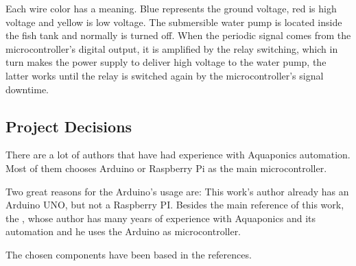 Each wire color has a meaning.
Blue represents the ground voltage,
red is high voltage
and yellow is low voltage.
The submersible water pump is located inside the fish tank and normally is turned off.
When the periodic signal comes from the microcontroller's digital output,
it is amplified by the relay switching,
which in turn makes the power supply to deliver high voltage to the water pump,
the latter works until the relay is switched again by the microcontroller's signal downtime.

\subsection{Project Decisions}
There are a lot of authors that have had experience with Aquaponics automation.
Most of them chooses Arduino or Raspberry Pi as the main microcontroller.

Two great reasons for the Arduino's usage are:
This work's author already has an Arduino UNO,
but not a Raspberry PI.
Besides the main reference of this work,
the \cite{Kretzinger2015},
whose author has many years of experience with Aquaponics and its automation and he uses the Arduino as microcontroller.

The chosen components have been based in the references.
